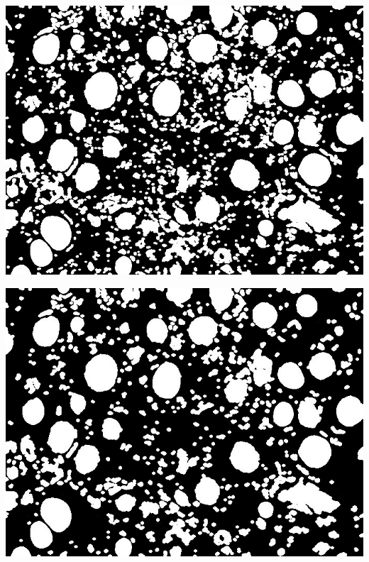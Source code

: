 \documentclass[a4paper]{article}
\begin{document}
\begin{minipage}{0.24\textwidth}
    \centering
    \includegraphics[width=\textwidth]{../code/task1/output/kernel_size_5.jpg}
\end{minipage}
\hfill
\begin{minipage}{0.24\textwidth}
    \centering
    \includegraphics[width=\textwidth]{../code/task1/output/kernel_size_7.jpg}
\end{minipage}
\end{document}
